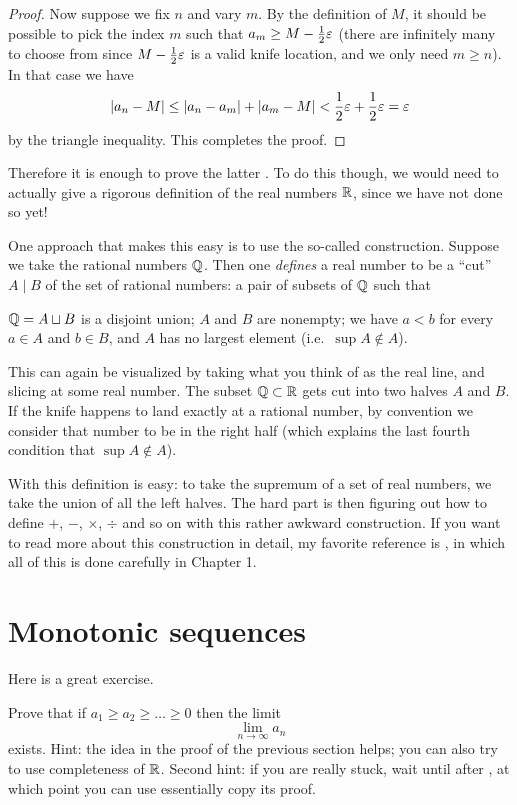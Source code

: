\begin{proof}
	Now suppose we fix $n$ and vary $m$.
	By the definition of $M$,
	it should be possible to pick the index $m$
	such that $a_m \ge M - \frac{1}{2} \varepsilon$
	(there are infinitely many to choose from
	since $M - \frac{1}{2}\varepsilon$ is a valid knife location,
	and we only need $m \ge n$).
	In that case we have
	\[ \left\lvert a_n - M \right\rvert
		\le \left\lvert a_n - a_m \right\rvert
		+ \left\lvert a_m - M \right\rvert <
		\frac{1}{2}\varepsilon + \frac{1}{2}\varepsilon = \varepsilon \]
	by the triangle inequality.
	This completes the proof.
\end{proof}

Therefore it is enough to prove the latter .
To do this though, we would need to actually give a rigorous definition of
the real numbers $\mathbb R$, since we have not done so yet!

One approach that makes this easy is to use the so-called
 construction.
Suppose we take the rational numbers $\mathbb Q$.
Then one \emph{defines} a real number to be a ``cut''
$A \mid B$ of the set of rational numbers:
a pair of subsets of $\mathbb Q$ such that
\begin{itemize}
	\ii $\mathbb Q = A \sqcup B$ is a disjoint union;
	\ii $A$ and $B$ are nonempty;
	\ii we have $a < b$ for every $a \in A$ and $b \in B$, and
	\ii $A$ has no largest element (i.e.\ $\sup A \notin A$).
\end{itemize}
This can again be visualized by taking what you think of
as the real line, and slicing at some real number.
The subset $\mathbb Q \subset \mathbb R$ gets cut into two halves $A$ and $B$.
If the knife happens to land exactly at a rational number,
by convention we consider that number to be in the right half
(which explains the last fourth condition that $\sup A \notin A$).

With this definition  is easy:
to take the supremum of a set of real numbers,
we take the union of all the left halves.
The hard part is then figuring out how to define $+$, $-$, $\times$, $\div$
and so on with this rather awkward construction.
If you want to read more about this construction in detail,
my favorite reference is \cite{ref:pugh},
in which all of this is done carefully in Chapter 1.

\section{Monotonic sequences}
Here is a great exercise.
\begin{exercise}
	[Mandatory]
	\label{exer:inf_exists}
	Prove that if $a_1 \ge a_2 \ge \dots \ge 0$
	then the limit
	\[ \lim_{n \to \infty} a_n \]
	exists.
	Hint: the idea in the proof of the previous section helps;
	you can also try to use completeness of $\mathbb R$.
	Second hint: if you are really stuck,
	wait until after ,
	at which point you can use essentially copy its proof.
\end{exercise}

